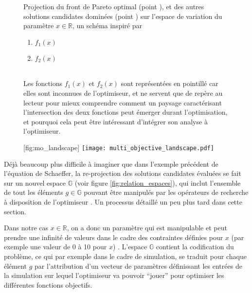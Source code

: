 \begin{figure}[!htbp]
	\begin{sidecaption}{Projection du front de Pareto optimal (point ), et des autres solutions candidates dominées (point ) sur l'espace de variation du paramètre $x \in \mathbb{R}$, un schéma inspiré par \textcite[67]{Weise2011}
	\parbox{\marginparwidth}{
	\begin{enumerate}[label={},labelindent=0pt,leftmargin=*]
	      \item {} $f_{1}(x)$
	      \item {} $f_{2}(x)$
	\end{enumerate}}\\
	Les fonctions $f_{1}(x)$ et $f_{2}(x)$ sont représentées en pointillé car elles sont inconnues de l'optimiseur, et ne servent que de repère au lecteur pour mieux comprendre comment un paysage caractérisant l'intersection des deux fonctions peut émerger durant l'optimisation, et pourquoi cela peut être intéressant d'intégrer son analyse à l'optimiseur.}[fig:mo_landscape]
	 \centering
	 	\texttt{[image: multi\_objective\_landscape.pdf]}
	\end{sidecaption}
\end{figure}


Déjà beaucoup plus difficile à imaginer que dans l'exemple précédent de l'équation de Schaeffer, la re-projection des solutions candidates évaluées se fait sur un nouvel espace $\mathbb{G}$ (voir figure \ref{fig:relation_espaces}), qui inclut l'ensemble de tout les éléments $g \in \mathbb{G}$ pouvant être manipulés par les opérateurs de recherche à disposition de l'optimiseur \autocite[82]{Weise2011}. Un processus détaillé un peu plus tard dans cette section.

Dans notre cas $x \in \mathbb{R}$, on a donc un paramètre qui est manipulable et peut prendre une infinité de valeurs dans le cadre des contraintes définies pour $x$ (par exemple une valeur de 0 à 10 pour $x$) . L'espace $\mathbb{G}$ contient la codification du problème, ce qui par exemple dans le cadre de simulation, se traduit pour chaque élément $g$ par l'attribution d'un vecteur de paramètres définissant les entrées de la simulation sur lequel l'optimiseur va pouvoir \enquote{jouer} pour optimiser les différentes fonctions objectifs.

